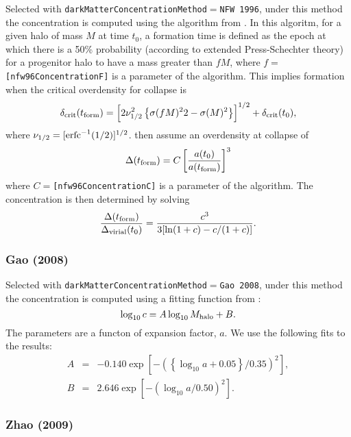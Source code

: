 Selected with {\tt darkMatterConcentrationMethod}$=${\tt NFW 1996}, under this method the concentration is computed using the algorithm from \cite{navarro_structure_1996}. In this algoritm, for a given halo of mass $M$ at time $t_0$, a formation time is defined as the epoch at which there is a 50\% probability (according to extended Press-Schechter theory) for a progenitor halo to have a mass greater than $fM$, where $f=${\tt [nfw96ConcentrationF]} is a parameter of the algorithm. This implies formation when the critical overdensity for collapse is
\begin{equation}
 \delta_{\rm crit}(t_{\rm form}) = \left[ 2 \nu_{1/2}^2 \left\{\sigma(fM)^22-\sigma(M)^2\right\} \right]^{1/2}+\delta_{\rm crit}(t_0),
\end{equation}
where $\nu_{1/2} = [\hbox{erfc}^{-1}(1/2)]^{1/2}$. \cite{navarro_structure_1996} then assume an overdensity at collapse of 
\begin{equation}
 \Delta(t_{\rm form}) = C  \left[ {a(t_0) \over a(t_{\rm form})} \right]^3
\end{equation}
where $C=${\tt [nfw96ConcentrationC]} is a parameter of the algorithm. The concentration is then determined by solving
\begin{equation}
 {\Delta(t_{\rm form}) \over \Delta_{\rm virial}(t_0)} = {c^3 \over 3 [\ln(1+c)-c/(1+c)]}.
\end{equation}

\subsubsection{Gao (2008)}

Selected with {\tt darkMatterConcentrationMethod}$=${\tt Gao 2008}, under this method the concentration is computed using a fitting function from \cite{gao_redshift_2008}:
\begin{equation}
\log_{10} c = A \log_{10} M_{\rm halo} + B.
\end{equation}
The parameters are a functon of expansion factor, $a$. We use the following fits to the \cite{gao_redshift_2008} results:
\begin{eqnarray}
A &=& -0.140 \exp\left[-\left(\left\{\log_{10}a+0.05\right\}/0.35\right)^2\right], \\
B &=&  2.646 \exp\left[-\left(\log_{10}a/0.50\right)^2\right].
\end{eqnarray}

\subsubsection{Zhao (2009)}

